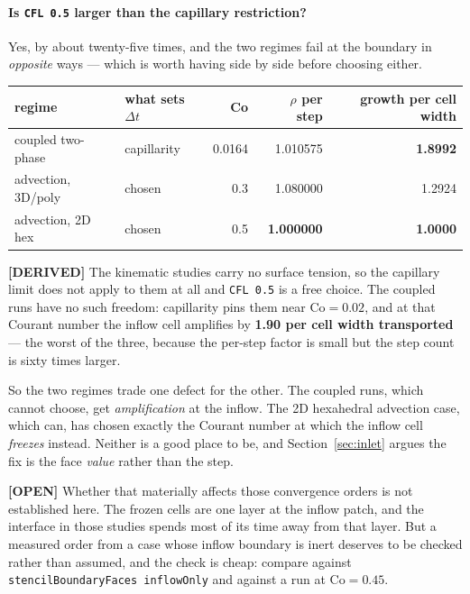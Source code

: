 \documentclass[11pt,a4paper]{article}
\newcommand{\derived}{\textcolor{blue!50!black}{\textbf{[DERIVED]}}}
\newcommand{\opn}{\textcolor{orange!80!black}{\textbf{[OPEN]}}}
\begin{document}
\paragraph{Is \texttt{CFL 0.5} larger than the capillary restriction?} Yes, by about
twenty-five times, and the two regimes fail at the boundary in \emph{opposite} ways --- which is
worth having side by side before choosing either.

\begin{center}
\begin{tabular}{llrrr}
\toprule
regime & what sets $\Delta t$ & Co & $\rho$ per step & growth per cell width \\
\midrule
coupled two-phase  & capillarity      & 0.0164 & 1.010575 & \textbf{1.8992} \\
advection, 3D/poly & chosen           & 0.3    & 1.080000 & 1.2924 \\
advection, 2D hex  & chosen           & 0.5    & \textbf{1.000000} & \textbf{1.0000} \\
\bottomrule
\end{tabular}
\end{center}

\derived{} The kinematic studies carry no surface tension, so the capillary limit does not apply
to them at all and \texttt{CFL 0.5} is a free choice. The coupled runs have no such freedom:
capillarity pins them near $\mathrm{Co} = 0.02$, and at that Courant number the inflow cell
amplifies by \textbf{1.90 per cell width transported} --- the worst of the three, because the
per-step factor is small but the step count is sixty times larger.

So the two regimes trade one defect for the other. The coupled runs, which cannot choose, get
\emph{amplification} at the inflow. The 2D hexahedral advection case, which can, has chosen
exactly the Courant number at which the inflow cell \emph{freezes} instead. Neither is a good
place to be, and Section~\ref{sec:inlet} argues the fix is the face \emph{value} rather than the
step.

\opn{} Whether that materially affects those convergence orders is not established here. The
frozen cells are one layer at the inflow patch, and the interface in those studies spends most
of its time away from that layer. But a measured order from a case whose inflow boundary is
inert deserves to be checked rather than assumed, and the check is cheap: compare against
\texttt{stencilBoundaryFaces inflowOnly} and against a run at $\mathrm{Co} = 0.45$.
\end{document}
